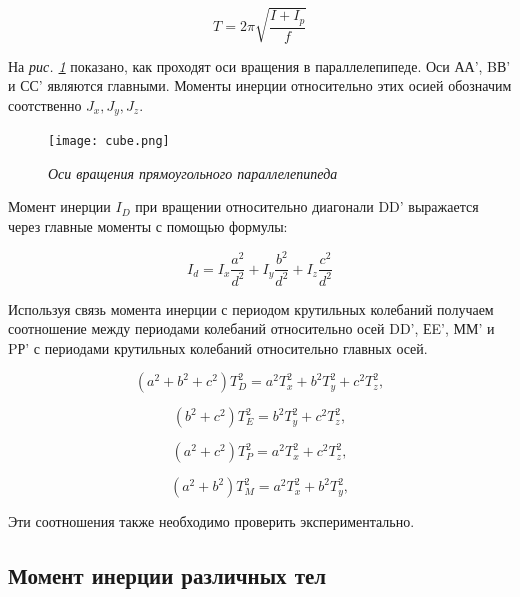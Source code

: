 \documentclass[a4paper,12pt]{article}
\begin{document}
\begin{equation}
    T = 2\pi\sqrt{\frac{I+I_{p}}{f}}
\end{equation}

На \textit{рис.  \ref{cube}} показано, как проходят оси вращения в параллелепипеде.
 Оси АА', BВ' и СС' являются главными. Моменты инерции относительно
этих осией обозначим соотственно $J_{x}, J_{y}, J_{z}$.\\

\begin{figure}[h!]
        \centering
	\texttt{[image: cube.png]}
	\caption{\textit{Оси вращения прямоугольного параллелепипеда}}
	\label{cube}
\end{figure}

Момент инерции $I_{D}$ при вращении относительно диагонали DD' выражается
 через главные моменты с помощью формулы:
 
\begin{equation}\label{main-d}
    I_{d}=I_{x}\frac{a^2}{d^2}+I_{y}\frac{b^2}{d^2}+I_{z}\frac{c^2}{d^2}
\end{equation}

Используя связь момента инерции с периодом крутильных колебаний
получаем соотношение между периодами колебаний относительно осей DD', ЕE',
ММ' и PР' с периодами крутильных колебаний относительно главных осей.

\begin{equation}\label{verify1}
    (a^2+b^2+c^2)T^2_{D}=a^2 T^2_{x}+b^2 T^2_{y}+c^2 T^2_{z},
\end{equation}

\begin{equation}\label{verify2}
    (b^2+c^2)T^2_{E}=b^2 T^2_{y}+c^2 T^2_{z},
\end{equation}

\begin{equation}\label{verify3}
    (a^2+c^2)T^2_{P}=a^2 T^2_{x}+c^2 T^2_{z},
\end{equation}

\begin{equation}\label{verify4}
    (a^2+b^2)T^2_{M}=a^2 T^2_{x}+b^2 T^2_{y},
\end{equation}

Эти соотношения также необходимо проверить экспериментально.

\subsection{Момент инерции различных тел}
\end{document}
